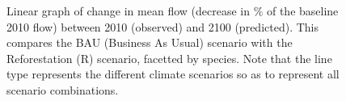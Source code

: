 \begin{figure}[h!]
 \caption[Linear graph of change in mean flow (decrease in \% of the baseline 2010 flow) between 2010 (observed) and 2100 (predicted), comparing BAU scenario with other land use change scenarios]{Linear graph of change in mean flow (decrease in \% of the baseline 2010 flow) between 2010 (observed) and 2100 (predicted). This compares the BAU (Business As Usual) scenario with the Reforestation (R) scenario, facetted by species. Note that the line type represents the different climate scenarios so as to represent all scenario combinations.}
 \label{fig:flow_linear_1}
\end{figure}


